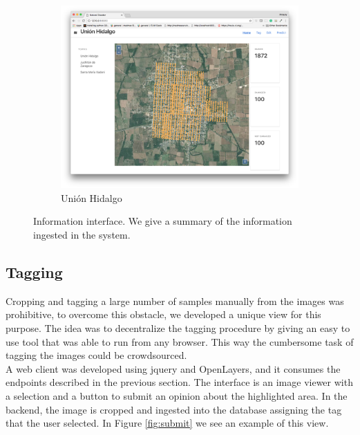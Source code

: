 \begin{figure}[ht]
\begin{subfigure}{.55\textwidth}
        \includegraphics[width=\textwidth]{images/small-app-union.png}
        \caption{Uni\'on Hidalgo}
    \end{subfigure}
  
  \caption{Information interface. We give a summary of the information ingested in the system.}
  \label{fig:visualize}
\end{figure}

\subsection{Tagging}

Cropping and tagging a large number of samples manually from the images was prohibitive, to overcome this obstacle, we developed a unique view for this purpose. The idea was to decentralize the tagging procedure by giving an easy to use tool that was able to run from any browser. This way the cumbersome task of tagging the images could be crowdsourced.\\

A web client was developed using jquery and OpenLayers, and it consumes the endpoints described in the previous section. The interface is an image viewer with a selection and a button to submit an opinion about the highlighted area. In the backend, the image is cropped and ingested into the database assigning the tag that the user selected. In Figure \ref{fig:submit} we see an example of this view.\\


